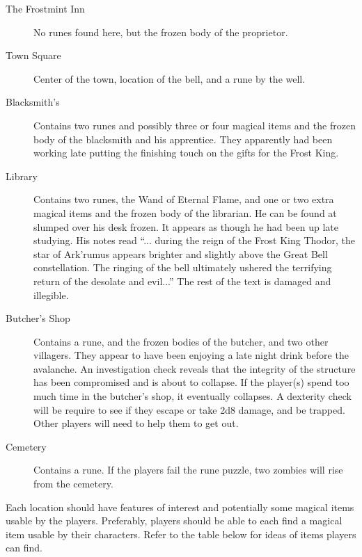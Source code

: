 \documentclass{article}
\begin{document}
\begin{multicols*}{2}
\begin{description}
\item[The Frostmint Inn] No runes found here, but the frozen body of the proprietor.
\item[Town Square] Center of the town, location of the bell, and a rune by the well.
\item[Blacksmith's] Contains two runes and possibly three or four magical items and the frozen body of the blacksmith and his apprentice. They apparently had been working late putting the finishing touch on the gifts for the Frost King. 
\item[Library] Contains two runes, the Wand of Eternal Flame, and one or two extra magical items and the frozen body of the librarian. He can be found at slumped over his desk frozen. It appears as though he had been up late studying. His notes read ``... during the reign of the Frost King Thodor, the star of Ark'rumus appears brighter and slightly above the Great Bell constellation. The ringing of the bell ultimately ushered the terrifying return of the desolate and evil...'' The rest of the text is damaged and illegible.
\item[Butcher's Shop] Contains a rune, and the frozen bodies of the butcher, and two other villagers. They appear to have been enjoying a late night drink before the avalanche. An investigation check reveals that the integrity of the structure has been compromised and is about to collapse. If the player(s) spend too much time in the butcher's shop, it eventually collapses. A dexterity check will be require to see if they escape or take 2d8 damage, and be trapped. Other players will need to help them to get out.
\item[Cemetery] Contains a rune. If the players fail the rune puzzle, two zombies will rise from the cemetery.

\end{description}

	Each location should have features of interest and potentially some magical items usable by the players. Preferably, players should be able to each find a magical item usable by their characters. Refer to the table below for ideas of items players can find.
	

\end{multicols*}
\end{document}

